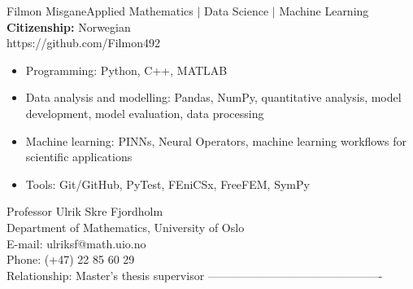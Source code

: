 \documentclass{article}
\begin{document}
\begin{cv}{Filmon Misgane}{Applied Mathematics $|$ Data Science $|$ Machine Learning}
    \cvsidebar
    \textbf{Citizenship:} Norwegian \\
    https://github.com/Filmon492

    \begin{itemize}
        \item Programming: Python, C++, MATLAB
        \item Data analysis and modelling: Pandas, NumPy, quantitative analysis, model development, model evaluation, data processing
        \item Machine learning: PINNs, Neural Operators, machine learning workflows for scientific applications
        \item Tools: Git/GitHub, PyTest, FEniCSx, FreeFEM, SymPy
    \end{itemize}
    \cvseparator
    Professor Ulrik Skre Fjordholm  \\
    Department of Mathematics, University of Oslo  \\
    E-mail: ulriksf@math.uio.no  \\
    Phone: (+47) 22 85 60 29  \\
    Relationship: Master's thesis supervisor
    ----------------------------------------------\\
\end{cv}
\end{document}
